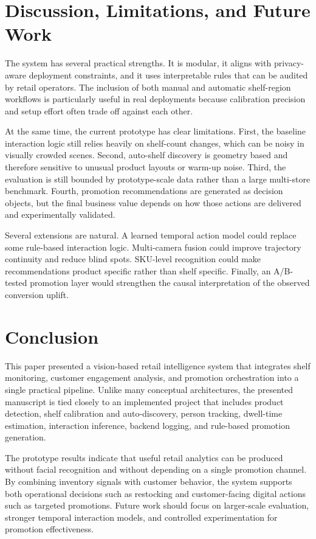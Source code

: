 \documentclass[conference]{IEEEtran}
\begin{document}
\section{Discussion, Limitations, and Future Work}

The system has several practical strengths. It is modular, it aligns with privacy-aware deployment constraints, and it uses interpretable rules that can be audited by retail operators. The inclusion of both manual and automatic shelf-region workflows is particularly useful in real deployments because calibration precision and setup effort often trade off against each other.

At the same time, the current prototype has clear limitations. First, the baseline interaction logic still relies heavily on shelf-count changes, which can be noisy in visually crowded scenes. Second, auto-shelf discovery is geometry based and therefore sensitive to unusual product layouts or warm-up noise. Third, the evaluation is still bounded by prototype-scale data rather than a large multi-store benchmark. Fourth, promotion recommendations are generated as decision objects, but the final business value depends on how those actions are delivered and experimentally validated.

Several extensions are natural. A learned temporal action model could replace some rule-based interaction logic. Multi-camera fusion could improve trajectory continuity and reduce blind spots. SKU-level recognition could make recommendations product specific rather than shelf specific. Finally, an A/B-tested promotion layer would strengthen the causal interpretation of the observed conversion uplift.

\section{Conclusion}

This paper presented a vision-based retail intelligence system that integrates shelf monitoring, customer engagement analysis, and promotion orchestration into a single practical pipeline. Unlike many conceptual architectures, the presented manuscript is tied closely to an implemented project that includes product detection, shelf calibration and auto-discovery, person tracking, dwell-time estimation, interaction inference, backend logging, and rule-based promotion generation.

The prototype results indicate that useful retail analytics can be produced without facial recognition and without depending on a single promotion channel. By combining inventory signals with customer behavior, the system supports both operational decisions such as restocking and customer-facing digital actions such as targeted promotions. Future work should focus on larger-scale evaluation, stronger temporal interaction models, and controlled experimentation for promotion effectiveness.
\end{document}
